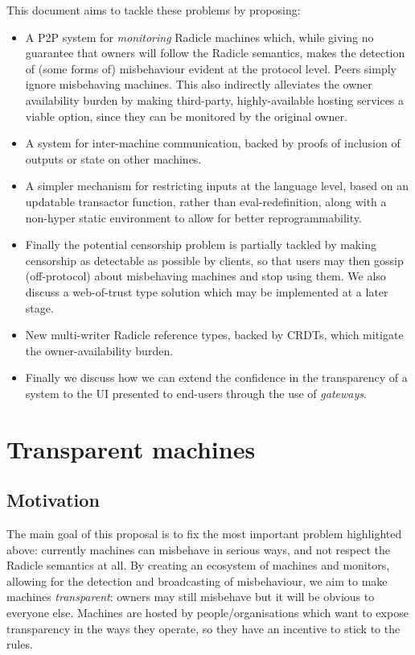\documentclass[a4paper, oneside, 10pt]{amsart}
\begin{document}
This document aims to tackle these problems by proposing:
\begin{itemize}
\item A P2P system for \emph{monitoring} Radicle machines which, while giving no
  guarantee that owners will follow the Radicle semantics, makes the detection
  of (some forms of) misbehaviour evident at the protocol level. Peers simply
  ignore misbehaving machines. This also indirectly alleviates the owner
  availability burden by making third-party, highly-available hosting services a
  viable option, since they can be monitored by the original owner.
\item A system for inter-machine communication, backed by proofs of inclusion of
  outputs or state on other machines.
\item A simpler mechanism for restricting inputs at the language level, based on
  an updatable transactor function, rather than eval-redefinition, along with a
  non-hyper static environment to allow for better reprogrammability.
\item Finally the potential censorship problem is partially tackled by making
  censorship as detectable as possible by clients, so that users may then gossip
  (off-protocol) about misbehaving machines and stop using them. We also discuss
  a web-of-trust type solution which may be implemented at a later stage.
\item
  New multi-writer Radicle reference types, backed by CRDTs, which mitigate the
  owner-availability burden.
\item
  Finally we discuss how we can extend the confidence in the transparency of a
  system to the UI presented to end-users through the use of \emph{gateways}.
\end{itemize}

\section{Transparent machines}\label{transparent-machines}

\subsection{Motivation}

The main goal of this proposal is to fix the most important problem highlighted
above: currently machines can misbehave in serious ways, and not respect the
Radicle semantics at all. By creating an ecosystem of machines and monitors,
allowing for the detection and broadcasting of misbehaviour, we aim to make
machines \emph{transparent}: owners may still misbehave but it will be obvious
to everyone else. Machines are hosted by people/organisations which want to
expose transparency in the ways they operate, so they have an incentive to stick
to the rules.
\end{document}
